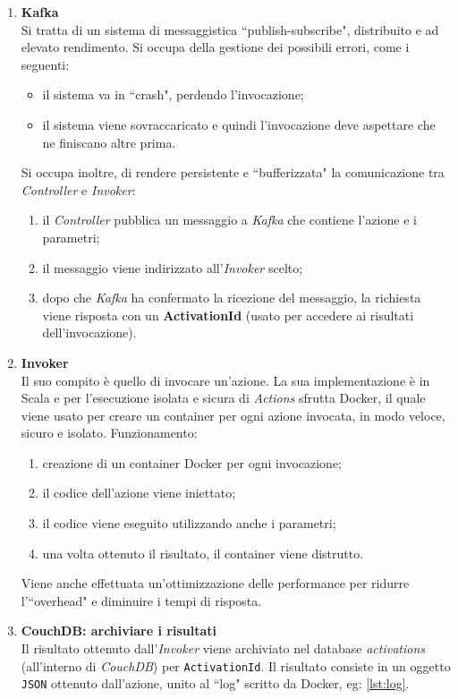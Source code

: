 \documentclass[12pt,a4paper,openany,twoside]{book}
\begin{document}
\begin{enumerate}
    \item \textbf{Kafka} \\
    Si tratta di un sistema di messaggistica ``publish-subscribe", distribuito e ad elevato rendimento.
    Si occupa della gestione dei possibili errori, come i seguenti:
    \begin{itemize}
        \item il sistema va in ``crash", perdendo l'invocazione;
        \item il sistema viene sovraccaricato e quindi l'invocazione deve aspettare che ne finiscano altre prima.
    \end{itemize}
    Si occupa inoltre, di rendere persistente e ``bufferizzata" la comunicazione tra \textit{Controller} e \textit{Invoker}:
    \begin{enumerate}
        \item il \textit{Controller} pubblica un messaggio a \textit{Kafka} che contiene l'azione e i parametri;
        \item il messaggio viene indirizzato all'\textit{Invoker} scelto;
        \item dopo che \textit{Kafka} ha confermato la ricezione del messaggio, la richiesta viene risposta con un \textbf{ActivationId} (usato per accedere ai risultati dell'invocazione).
    \end{enumerate}
    
    \item \textbf{Invoker} \\
    Il suo compito è quello di invocare un'azione. La sua implementazione è in Scala e per l'esecuzione isolata e sicura di \textit{Actions} sfrutta Docker, il quale viene usato per creare un container per ogni azione invocata, in modo veloce, sicuro e isolato.
    Funzionamento:
    \begin{enumerate}
        \item creazione di un container Docker per ogni invocazione;
        \item il codice dell'azione viene iniettato;
        \item il codice viene eseguito utilizzando anche i parametri;
        \item una volta ottenuto il risultato, il container viene distrutto.
    \end{enumerate}
    Viene anche effettuata un'ottimizzazione delle performance per ridurre l'``overhead" e diminuire i tempi di risposta.
    
    \item \textbf{CouchDB: archiviare i risultati} \\
    Il risultato ottenuto dall'\textit{Invoker} viene archiviato nel database \textit{activations} (all'interno di \textit{CouchDB}) per \texttt{ActivationId}.
    Il risultato consiste in un oggetto \texttt{JSON} ottenuto dall'azione, unito al ``log" scritto da Docker, eg: \cref{lst:log}.


\end{enumerate}
\end{document}
